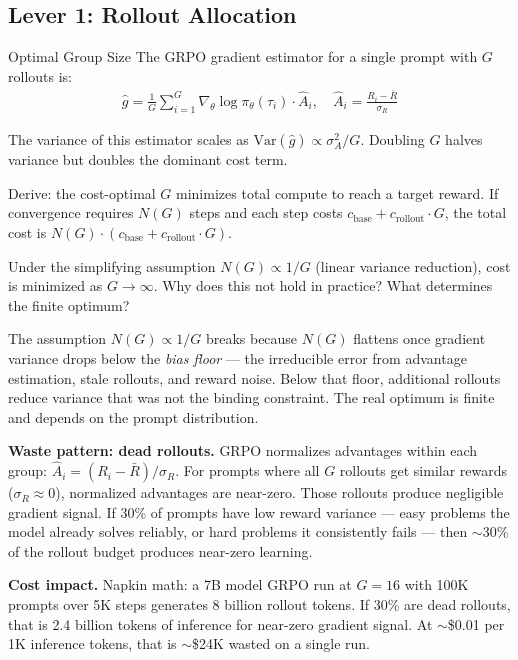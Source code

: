 \subsection{Lever 1: Rollout Allocation}

\begin{thinkfirst}{Optimal Group Size}
The GRPO gradient estimator for a single prompt with $G$ rollouts is:
\begin{align*}
  \hat{g} = \frac{1}{G} \sum_{i=1}^{G} \nabla_\theta \log \pi_\theta(\tau_i) \cdot \hat{A}_i, \quad \hat{A}_i = \frac{R_i - \bar{R}}{\sigma_R}
\end{align*}

The variance of this estimator scales as $\mathrm{Var}(\hat{g}) \propto \sigma^2_A / G$. Doubling $G$ halves variance but doubles the dominant cost term.

Derive: the cost-optimal $G$ minimizes total compute to reach a target reward. If convergence requires $N(G)$ steps and each step costs $c_{\mathrm{base}} + c_{\mathrm{rollout}} \cdot G$, the total cost is $N(G) \cdot (c_{\mathrm{base}} + c_{\mathrm{rollout}} \cdot G)$.

Under the simplifying assumption $N(G) \propto 1/G$ (linear variance reduction), cost is minimized as $G \to \infty$. Why does this not hold in practice? What determines the finite optimum?
\end{thinkfirst}

The assumption $N(G) \propto 1/G$ breaks because $N(G)$ flattens once gradient variance drops below the \textit{bias floor} --- the irreducible error from advantage estimation, stale rollouts, and reward noise. Below that floor, additional rollouts reduce variance that was not the binding constraint. The real optimum is finite and depends on the prompt distribution.

\textbf{Waste pattern: dead rollouts.} GRPO normalizes advantages within each group: $\hat{A}_i = (R_i - \bar{R}) / \sigma_R$. For prompts where all $G$ rollouts get similar rewards ($\sigma_R \approx 0$), normalized advantages are near-zero. Those rollouts produce negligible gradient signal. If 30\% of prompts have low reward variance --- easy problems the model already solves reliably, or hard problems it consistently fails --- then $\sim$30\% of the rollout budget produces near-zero learning.

\textbf{Cost impact.} Napkin math: a 7B model GRPO run at $G = 16$ with 100K prompts over 5K steps generates 8 billion rollout tokens. If 30\% are dead rollouts, that is 2.4 billion tokens of inference for near-zero gradient signal. At $\sim$\$0.01 per 1K inference tokens, that is $\sim$\$24K wasted on a single run.

